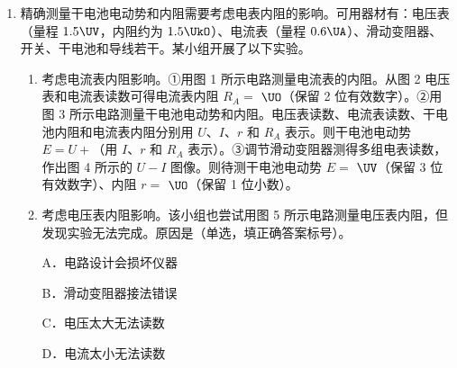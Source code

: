 \documentclass[\gkver]{gaokaozhenti}
\begin{document}
\begin{enumerate}
{化简可得

$\frac{1}{a} = \frac{1}{mg} \cdot M + \frac{1}{g}$

故斜率越小，槽码的质量 $m$ 越大，由图可知甲组所用的槽码质量比乙组的更大。
}

\item
精确测量干电池电动势和内阻需要考虑电表内阻的影响。可用器材有：电压表（量程 $1.5 \UV$，内阻约为 $1.5 \UkO$）、电流表（量程 $0.6 \UA$）、滑动变阻器、开关、干电池和导线若干。某小组开展了以下实验。
\begin{enumerate}
	\item
	考虑电流表内阻影响。①用图 1 所示电路测量电流表的内阻。从图 2 电压表和电流表读数可得电流表内阻 $R_{A} = $ $\UO$（保留 2 位有效数字）。②用图 3 所示电路测量干电池电动势和内阻。电压表读数、电流表读数、干电池内阻和电流表内阻分别用 $U$、$I$、$r$ 和 $R_{A}$ 表示。则干电池电动势 $E = U + $（用 $I$、$r$ 和 $R_{A}$ 表示）。③调节滑动变阻器测得多组电表读数，作出图 4 所示的 $U - I$ 图像。则待测干电池电动势 $E = $ $\UV$（保留 3 位有效数字）、内阻 $r = $ $\UO$（保留 1 位小数）。
	\item
	考虑电压表内阻影响。该小组也尝试用图 5 所示电路测量电压表内阻，但发现实验无法完成。原因是（单选，填正确答案标号）。

	A．电路设计会损坏仪器

	B．滑动变阻器接法错误

	C．电压太大无法读数

	D．电流太小无法读数
\end{enumerate}



\end{enumerate}
\end{document}
